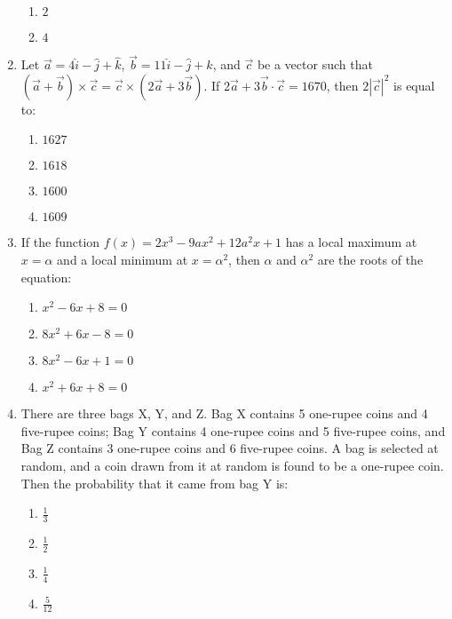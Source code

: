 \documentclass[journal,12pt,onecolumn]{IEEEtran}
\theoremstyle{remark}
\begin{document}
\begin{enumerate}
\begin{enumerate}
        \item $2$
        \item $4$
    \end{enumerate}
    \item Let $\overrightarrow{a} = 4\hat{i} - \hat{j} + \hat{k}$, $\overrightarrow{b} = 11\hat{i} - \hat{j} + \hat{k}$, and $\overrightarrow{c}$ be a vector such that $(\overrightarrow{a} + \overrightarrow{b}) \times \overrightarrow{c} = \overrightarrow{c} \times (2\overrightarrow{a} + 3\overrightarrow{b})$. If $2\overrightarrow{a} + 3\overrightarrow{b} \cdot \overrightarrow{c} = 1670$, then $2|\overrightarrow{c}|^2$ is equal to:
    \begin{enumerate}
        \item $1627$
        \item $1618$
        \item $1600$
        \item $1609$
    \end{enumerate}
    \item If the function $f(x) = 2x^3 - 9ax^2 + 12a^2x + 1$ has a local maximum at $x = \alpha$ and a local minimum at $x = \alpha^2$, then $\alpha$ and $\alpha^2$ are the roots of the equation:
    \begin{enumerate}
        \item $x^2 - 6x + 8 = 0$
        \item $8x^2 + 6x - 8 = 0$
        \item $8x^2 - 6x + 1 = 0$
        \item $x^2 + 6x + 8 = 0$
    \end{enumerate}
    \item There are three bags X, Y, and Z. Bag X contains 5 one-rupee coins and 4 five-rupee coins; Bag Y contains 4 one-rupee coins and 5 five-rupee coins, and Bag Z contains 3 one-rupee coins and 6 five-rupee coins. A bag is selected at random, and a coin drawn from it at random is found to be a one-rupee coin. Then the probability that it came from bag Y is:
    \begin{enumerate}
        \item $\frac{1}{3}$
        \item $\frac{1}{2}$
        \item $\frac{1}{4}$
        \item $\frac{5}{12}$
    \end{enumerate}
\end{enumerate}
\end{document}
